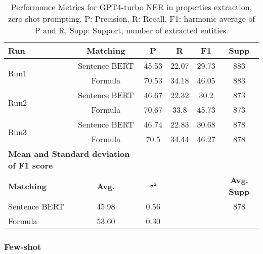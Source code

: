 \begin{table}[htbp]
\small
  \centering
  \caption{Performance Metrics for GPT4-turbo NER in properties extraction, zero-shot prompting. P: Precision, R: Recall, F1: harmonic average of P and R, Supp: Support, number of extracted entities.}
  \begin{tabular}{lccccc}
    \toprule
    \textbf{Run} & \textbf{Matching} & \textbf{P} & \textbf{R} & \textbf{F1} & \textbf{Supp} \\
    \midrule
    \multirow{2}{*}{Run1} & Sentence BERT & 45.53 & 22.07 & 29.73 & 883 \\
    & Formula & 70.53 & 34.18 & 46.05 & 883 \\
    \midrule
    \multirow{2}{*}{Run2} & Sentence BERT & 46.67 & 22.32 & 30.2 & 873 \\
    & Formula & 70.67 & 33.8 & 45.73 & 873 \\
    \midrule
    \multirow{2}{*}{Run3} & Sentence BERT & 46.74 & 22.83 & 30.68 & 878 \\
    & Formula & 70.5 & 34.44 & 46.27 & 878 \\
    \midrule
    \multicolumn{2}{l}{\textbf{Mean and Standard deviation of F1 score}} & & & & \\
    \midrule
    \textbf{Matching} & \textbf{Avg.} & $\sigma\textsuperscript{2}$ & & & \textbf{Avg. Supp}\\
    Sentence BERT & 45.98 & 0.56 & & & 878 \\
    Formula & 53.60 & 0.30 & & & \\
    \bottomrule
  \end{tabular}
\end{table}


\clearpage
\subsubsection{Few-shot}

